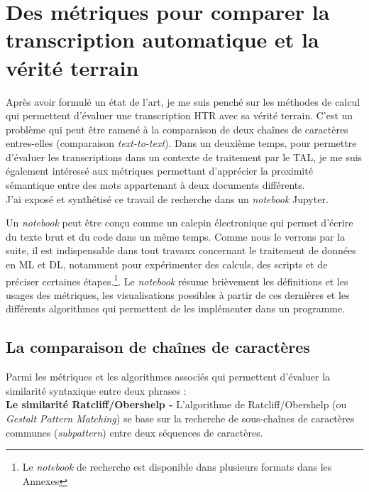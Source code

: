 \section{Des métriques pour comparer la transcription automatique et la vérité terrain}\label{metriques}

Après avoir formulé un état de l'art, je me suis penché sur les méthodes de calcul qui permettent d'évaluer une transcription HTR avec sa vérité terrain. C'est un problème qui peut être ramené à la comparaison de deux chaînes de caractères entres-elles (comparaison \textit{text-to-text}). Dans un deuxième temps, pour permettre d'évaluer les transcriptions dans un contexte de traitement par le TAL, je me suis également intéressé aux métriques permettant d'apprécier la proximité sémantique entre des mots appartenant à deux documents différents.\\

J'ai exposé et synthétisé ce travail de recherche dans un \textit{notebook} Jupyter. 

Un \textit{notebook} peut être conçu comme un calepin électronique qui permet d'écrire du texte brut et du code dans un même temps. Comme nous le verrons par la suite, il est indispensable dans tout travaux concernant le traitement de données en ML et DL, notamment pour expérimenter des calculs, des scripts et de préciser certaines étapes.\footnote{Le \textit{notebook} de recherche est disponible dans plusieurs formats dans les Annexes  }. Le \textit{notebook} résume brièvement les définitions et les usages des métriques, les visualisations possibles à partir de ces dernières et les différents algorithmes qui permettent de les implémenter dans un programme.\\

\subsection{La comparaison de chaînes de caractères}

Parmi les métriques et les algorithmes associés qui permettent d'évaluer la similarité syntaxique entre deux phrases :\\

\textbf{Le similarité Ratcliff/Obershelp -} L'algorithme de Ratcliff/Obershelp (ou \textit{Gestalt Pattern Matching}) se base sur la recherche de sous-chaînes de caractères communes (\textit{subpattern}) entre deux séquences de caractères.\\

